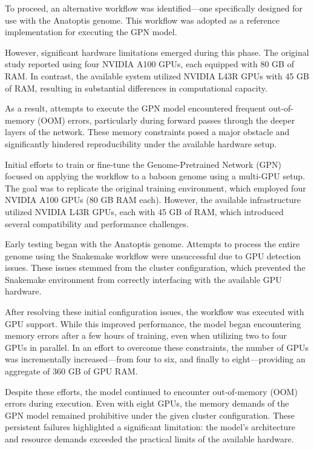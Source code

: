 \documentclass[
  a4paper,
  openany]{scrbook}
\begin{document}
To proceed, an alternative workflow was identified---one specifically
designed for use with the Anatoptis genome. This workflow was adopted as
a reference implementation for executing the GPN model.

However, significant hardware limitations emerged during this phase. The
original study reported using four NVIDIA A100 GPUs, each equipped with
80 GB of RAM. In contrast, the available system utilized NVIDIA L43R
GPUs with 45 GB of RAM, resulting in substantial differences in
computational capacity.

As a result, attempts to execute the GPN model encountered frequent
out-of-memory (OOM) errors, particularly during forward passes through
the deeper layers of the network. These memory constraints posed a major
obstacle and significantly hindered reproducibility under the available
hardware setup.

Initial efforts to train or fine-tune the Genome-Pretrained Network
(GPN) focused on applying the workflow to a baboon genome using a
multi-GPU setup. The goal was to replicate the original training
environment, which employed four NVIDIA A100 GPUs (80 GB RAM each).
However, the available infrastructure utilized NVIDIA L43R GPUs, each
with 45 GB of RAM, which introduced several compatibility and
performance challenges.

Early testing began with the Anatoptis genome. Attempts to process the
entire genome using the Snakemake workflow were unsuccessful due to GPU
detection issues. These issues stemmed from the cluster configuration,
which prevented the Snakemake environment from correctly interfacing
with the available GPU hardware.

After resolving these initial configuration issues, the workflow was
executed with GPU support. While this improved performance, the model
began encountering memory errors after a few hours of training, even
when utilizing two to four GPUs in parallel. In an effort to overcome
these constraints, the number of GPUs was incrementally increased---from
four to six, and finally to eight---providing an aggregate of 360 GB of
GPU RAM.

Despite these efforts, the model continued to encounter out-of-memory
(OOM) errors during execution. Even with eight GPUs, the memory demands
of the GPN model remained prohibitive under the given cluster
configuration. These persistent failures highlighted a significant
limitation: the model's architecture and resource demands exceeded the
practical limits of the available hardware.
\end{document}
